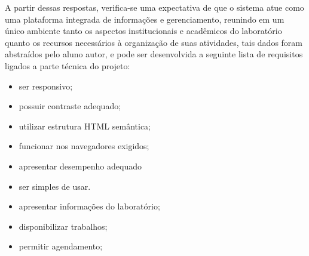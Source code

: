 A partir dessas respostas, verifica-se uma expectativa de que o sistema atue como uma plataforma integrada de informações e gerenciamento, reunindo em um único ambiente tanto os aspectos institucionais e acadêmicos do laboratório quanto os recursos necessários à organização de suas atividades, tais dados foram abstraídos pelo aluno autor, e pode ser desenvolvida a seguinte lista de requisitos ligados a parte técnica do projeto:
\begin{itemize}
	\item ser responsivo;
	\item possuir contraste adequado;
	\item utilizar estrutura HTML semântica;
	\item funcionar nos navegadores exigidos;
	\item apresentar desempenho adequado
	\item ser simples de usar.
	\item apresentar informações do laboratório;
	\item disponibilizar trabalhos;
	\item permitir agendamento;
\end{itemize}
